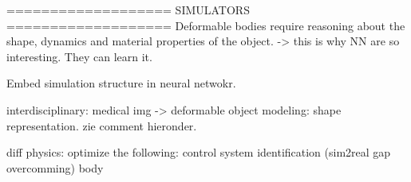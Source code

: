 \documentclass[\home/main.tex]{subfiles}
\begin{document}
===================
SIMULATORS 
===================
Deformable bodies require reasoning about the shape, dynamics and material properties of the object. -> this is why NN are so interesting. They can learn it.

Embed simulation structure in neural netwokr. 

interdisciplinary: medical img -> deformable object modeling: shape representation. zie comment hieronder.


diff physics:
    optimize the following:
        control
        system identification  (sim2real gap overcomming)
        body 
\end{document}
